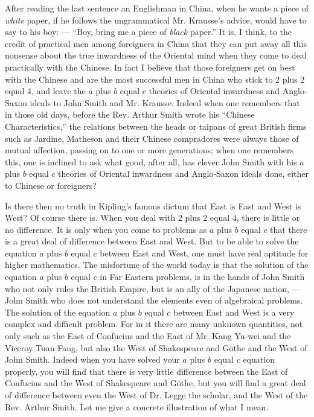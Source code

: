 After reading the last sentence an Englishman in China, when he wants a piece of \emph{white} paper, if he follows the ungrammatical Mr. Krausse's advice, would have to say to his boy: --- ``Boy, bring me a piece of \emph{black} paper.''
It is, I think, to the credit of practical men among foreigners in China that they can put away all this nonsense about the true inwardness of the Oriental mind when they come to deal practically with the Chinese.
In fact I believe that those foreigners get on best with the Chinese and are the most successful men in China who stick to 2 plus 2 equal 4, and leave the $a$ plus $b$ equal $c$ theories of Oriental inwardness and Anglo-Saxon ideals to John Smith and Mr. Krausse.
Indeed when one remembers that in those old days, before the Rev. Arthur Smith wrote his ``Chinese Characteristics,'' the relations between the heads or taipans of great British firms such as Jardine, Matheson and their Chinese compradores were always those of mutual affection, passing on to one or more generations;
when one remembers this, one is inclined to ask what good, after all, has clever John Smith with his $a$ plus $b$ equal $c$ theories of Oriental inwardness and Anglo-Saxon ideals done, either to Chinese or foreigners?

Is there then no truth in Kipling's famous dictum that East is East and West is West?
Of course there is.
When you deal with 2 plus 2 equal 4, there is little or no difference.
It is only when you come to problems as $a$ plus $b$ equal $c$ that there is a great deal of difference between East and West.
But to be able to solve the equation $a$ plus $b$ equal $c$ between East and West, one must have real aptitude for higher mathematics.
The misfortune of the world today is that the solution of the equation $a$ plus $b$ equal $c$ in Far Eastern problems, is in the hands of John Smith who not only rules the British Empire, but is an ally of the Japanese nation, --- John Smith who does not understand the elements even of algebraical problems.
The solution of the equation $a$ plus $b$ equal $c$ between East and West is a very complex and difficult problem.
For in it there are many unknown quantities, not only such as the East of Confucius and the East of Mr. Kang Yu-wei and the Viceroy Tuan Fang, but also the West of Shakespeare and G\"othe and the West of John Smith.
Indeed when you have solved your $a$ plus $b$ equal $c$ equation properly, you will find that there is very little difference between the East of Confucius and the West of Shakespeare and G\"othe, but you will find a great deal of difference between even the West of Dr. Legge the scholar, and the West of the Rev. Arthur Smith.
Let me give a concrete illustration of what I mean.

